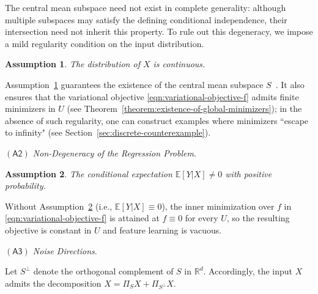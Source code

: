 \documentclass[sn-mathphys-num]{sn-jnl}%
\numberwithin{equation}{section}
\newcommand{\R}{\mathbb{R}}
\newcommand{\E}{\mathbb{E}}
\newtheorem{assumption}{Assumption}[section]
\theoremstyle{thmstyleone}%
\theoremstyle{thmstyletwo}%
\theoremstyle{thmstylethree}%
\begin{document}
\vspace{.5em}
The central mean subspace need not exist in complete generality: although multiple
subspaces may satisfy the defining conditional independence, their intersection
need not inherit this property. To rule out this degeneracy, we impose a mild
regularity condition on the input distribution.


\vspace{.5em}
\begin{assumption}
\label{assumption:X-continuous}
The distribution of $X$ is continuous.
\end{assumption}

\vspace{.5em}
Assumption~\ref{assumption:X-continuous} guarantees the existence of the central
mean subspace $S$~\cite{CookLi02}. It also ensures that the variational objective
\eqref{eqn:variational-objective-f} admits finite minimizers in $U$ (see 
Theorem~\ref{theorem:existence-of-global-minimizers}); in the absence
of such regularity, one can construct examples where  minimizers ``escape to infinity"
(see Section~\ref{sec:discrete-counterexample}).
 

\vspace{.8em}
\noindent\noindent
\emph{$\mathsf{(A2)}$ Non-Degeneracy of the Regression Problem}. 

\vspace{.3em}
\begin{assumption}
\label{assumption:non-degeneracy}
The conditional expectation $\E[Y|X] \neq 0$ with positive probability.
\end{assumption}
 
\vspace{.5em}
Without Assumption~\ref{assumption:non-degeneracy} (i.e., $\E[Y|X] \equiv 0$), the inner minimization over $f$ in
\eqref{eqn:variational-objective-f} is attained at $f \equiv 0$ for every $U$,
so the resulting objective is constant  in $U$ and feature learning is
vacuous.

\vspace{.8em}
\noindent\noindent
\emph{$\mathsf{(A3)}$ Noise Directions}.  

\vspace{.3em}
Let $S^\perp$ denote the orthogonal complement of $S$ in $\R^d$. 
Accordingly, the input $X$ admits 
the decomposition $X = \Pi_S X + \Pi_{S^\perp} X$.
\end{document}
